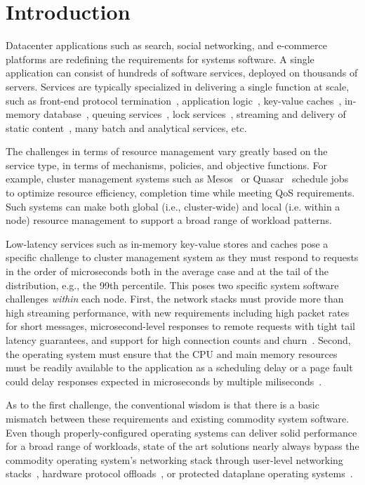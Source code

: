 
\section{Introduction}



Datacenter applications such as search, social networking, and
e-commerce platforms are redefining the requirements for systems
software. A single application can consist of hundreds of software
services, deployed on thousands of servers.  Services are typically
specialized in delivering a single function at scale, such as
front-end protocol termination~\cite{missing}, application
logic~\cite{missing}, key-value caches~\cite{missing}, in-memory
database~\cite{missing}, queuing services~\cite{missing}, lock
services~\cite{missing}, streaming and delivery of static content~\cite{missing},
many batch and analytical services, etc.

The challenges in terms of resource management vary greatly based on
the service type, in terms of mechanisms, policies, and objective
functions.  For example, cluster management systems such as
Mesos~\cite{mesos} or Quasar~\cite{quasar} schedule jobs to optimize
resource efficiency, completion time while meeting QoS requirements.
Such systems can make both global (i.e., cluster-wide) and local
(i.e. within a node) resource management to support a broad range of
workload patterns.

Low-latency services such as in-memory key-value stores and caches
pose a specific challenge to cluster management system as they must
respond to requests in the order of microseconds both in the average
case and at the tail of the distribution, e.g., the 99th percentile.
This poses two specific system software challenges
\emph{within} each node.   First, the network stacks must provide more
than high streaming performance, with new requirements including high
packet rates for short messages, microsecond-level responses to remote
requests with tight tail latency guarantees, and support for high
connection counts and
churn~\cite{Atikoglu:2012:WAL,DBLP:journals/cacm/DeanB13,DBLP:conf/nsdi/NishtalaFGKLLMPPSSTV13}.
Second, the operating system must ensure that the CPU and main memory
resources must be readily available to the application as a scheduling
delay or a page fault could delay responses expected in microseconds
by multiple miliseconds~\cite{missing}.

As to the first challenge, the conventional wisdom is that there is a
basic mismatch between these requirements and existing commodity
system software.  Even though properly-configured operating systems
can deliver solid performance for a broad range of workloads, state of
the art solutions nearly always bypass the commodity operating
system's networking stack through user-level networking
stacks~\cite{mtcp,DBLP:conf/cloud/KapoorPTVV12,sandstorm,openonload,DBLP:conf/sigcomm/ThekkathNML93},
hardware protocol
offloads~\cite{dragojevic14farm,DBLP:conf/icpp/JoseSLZHWIOWSP11,mitchell:rdma,DBLP:conf/sosp/OngaroRSOR11},
or protected dataplane operating systems~\cite{ix-osdi}.

